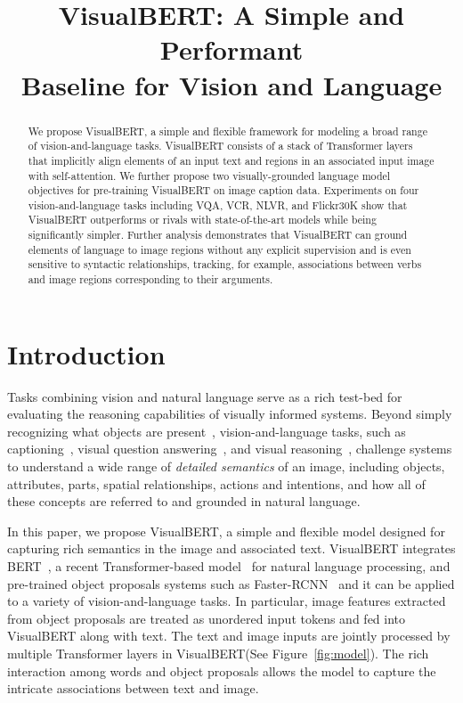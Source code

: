 \documentclass{article} \usepackage{iclr2019_conference,times}
\title{VisualBERT: A Simple and Performant\\ Baseline for Vision and Language}
{\centering
\author{Liunian Harold Li, Mark Yatskar, Da Yin, Cho-Jui Hsieh \& Kai-Wei Chang\\
University of California, Los Angeles\\
Allen Institute for Artificial Intelligence\\
Peking University\\
\texttt{liunian.harold.li@cs.ucla.edu,  marky@allenai.org,}\\
\texttt{wade\_yin9712@pku.edu.cn, \{chohsieh, kwchang\}@cs.ucla.edu} \\
}
}
\newcommand{\model}{VisualBERT\xspace}
\newcommand{\nlvr}{NLVR\xspace}
\begin{document}
\maketitle

\begin{abstract}
We propose VisualBERT, a simple and flexible framework for modeling a broad range of vision-and-language tasks. VisualBERT consists of a stack of Transformer layers that implicitly align elements of an input text and regions in an associated input image with self-attention. We further propose two visually-grounded language model objectives for pre-training VisualBERT on image caption data. Experiments on four vision-and-language tasks including VQA, VCR, \nlvr, and Flickr30K show that VisualBERT outperforms or rivals with state-of-the-art models while being significantly simpler.
Further analysis demonstrates that VisualBERT can ground elements of language to image regions without any explicit supervision and is even sensitive to syntactic relationships, tracking, for example, associations between verbs and image regions corresponding to their arguments.
\end{abstract}

\section{Introduction}

Tasks combining vision and natural language serve as a rich test-bed for evaluating the reasoning capabilities of visually informed systems.
Beyond simply recognizing what objects are present~\citep{russakovsky2015imagenet,lin2014microsoft}, vision-and-language tasks, such as captioning~\citep{chen2015microsoft}, visual question answering~\citep{antol2015vqa}, and visual reasoning~\citep{suhr2018corpus,zellers2019recognition}, challenge systems to understand a wide range of \textit{detailed semantics} of an image, including objects, attributes, parts, spatial relationships, actions and intentions, and how all of these concepts are referred to and grounded in natural language. 

In this paper, we propose \model, a simple and flexible model designed for capturing rich semantics in the image and associated text. \model integrates BERT~\citep{devlin2018bert}, a recent Transformer-based model~\citep{vaswani2017attention} for natural language processing, and pre-trained object proposals systems such as Faster-RCNN~\citep{ren2015faster} and it can be applied to a variety of vision-and-language tasks. In particular, image features extracted from object proposals are treated as unordered input tokens and fed into \model along with text. The text and image inputs are jointly processed  by multiple Transformer layers in \model (See Figure~\ref{fig:model}). The rich interaction among words and object proposals allows the model to capture the intricate associations between text and image.
\end{document}
